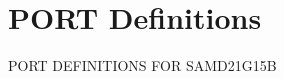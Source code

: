 \hypertarget{group___s_a_m_d21_g15_b__port}{}\section{P\+O\+RT Definitions}
\label{group___s_a_m_d21_g15_b__port}
P\+O\+RT D\+E\+F\+I\+N\+I\+T\+I\+O\+NS F\+OR S\+A\+M\+D21\+G15B 